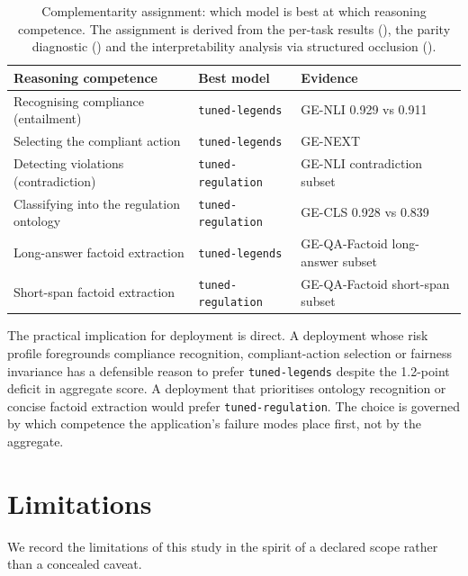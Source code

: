 \documentclass[pdflatex, sn-apa]{sn-jnl}%
\theoremstyle{thmstyleone}%
\theoremstyle{thmstyletwo}%
\theoremstyle{thmstylethree}%
\newcommand{\modellegends}{\texttt{tuned-legends}}
\newcommand{\modelreg}{\texttt{tuned-regulation}}
\begin{document}
\begin{table}[h]
\centering
\caption{Complementarity assignment: which model is best at which reasoning
competence. The assignment is derived from the per-task results
(), the parity diagnostic () and the
interpretability analysis via structured occlusion ().}
\label{tab:complementarity}
\small
\begin{tabular}{@{}lll@{}}
\toprule
Reasoning competence                          & Best model         & Evidence \\
\midrule
Recognising compliance (entailment)           & \modellegends      & GE-NLI
0.929 vs 0.911 \\
Selecting the compliant action                & \modellegends      & GE-NEXT \\
Detecting violations (contradiction)          & \modelreg          & GE-NLI
contradiction subset \\
Classifying into the regulation ontology      & \modelreg          & GE-CLS
0.928 vs 0.839 \\
Long-answer factoid extraction                & \modellegends      &
GE-QA-Factoid long-answer subset \\
Short-span factoid extraction                 & \modelreg          &
GE-QA-Factoid short-span subset \\
\bottomrule
\end{tabular}
\end{table}

The practical implication for deployment is direct. A deployment whose risk
profile foregrounds compliance recognition, compliant-action selection or
fairness invariance has a defensible reason to prefer \modellegends{} despite the
1.2-point deficit in aggregate score. A deployment that prioritises ontology
recognition or concise factoid extraction would prefer \modelreg. The choice is
governed by which competence the application's failure modes place first, not by
the aggregate.

\FloatBarrier

\section{Limitations}
\label{sec:limitations}

We record the limitations of this study in the spirit of a declared scope rather
than a concealed caveat.
\end{document}
